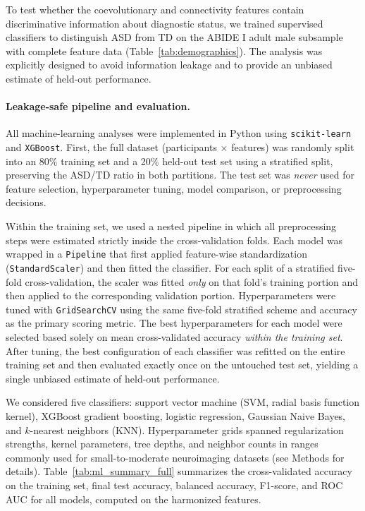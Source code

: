 \documentclass[10pt,letterpaper]{article}
\begin{document}
To test whether the coevolutionary and connectivity features contain discriminative information
about diagnostic status, we trained supervised classifiers to distinguish ASD from TD on the ABIDE I
adult male subsample with complete feature data (Table~\ref{tab:demographics}). The analysis was
explicitly designed to avoid information leakage and to provide an unbiased estimate of held-out
performance.

\paragraph*{Leakage-safe pipeline and evaluation.}
All machine-learning analyses were implemented in Python using \texttt{scikit-learn} and
\texttt{XGBoost}. First, the full dataset (participants $\times$ features) was randomly split into
an 80\% training set and a 20\% held-out test set using a stratified split, preserving the ASD/TD
ratio in both partitions. The test set was \emph{never} used for feature selection, hyperparameter
tuning, model comparison, or preprocessing decisions.

Within the training set, we used a nested pipeline in which all preprocessing steps were estimated
strictly inside the cross-validation folds. Each model was wrapped in a \texttt{Pipeline} that
first applied feature-wise standardization (\texttt{StandardScaler}) and then fitted the classifier.
For each split of a stratified five-fold cross-validation, the scaler was fitted \emph{only} on
that fold's training portion and then applied to the corresponding validation portion. Hyperparameters
were tuned with \texttt{GridSearchCV} using the same five-fold stratified scheme and accuracy as
the primary scoring metric. The best hyperparameters for each model were selected based solely on
mean cross-validated accuracy \emph{within the training set}. After tuning, the best configuration
of each classifier was refitted on the entire training set and then evaluated exactly once on the
untouched test set, yielding a single unbiased estimate of held-out performance.

We considered five classifiers: support vector machine (SVM, radial basis function kernel), XGBoost
gradient boosting, logistic regression, Gaussian Naive Bayes, and $k$-nearest neighbors (KNN).
Hyperparameter grids spanned regularization strengths, kernel parameters, tree depths, and neighbor
counts in ranges commonly used for small-to-moderate neuroimaging datasets (see Methods for details).
Table~\ref{tab:ml_summary_full} summarizes the cross-validated accuracy on the training set, final
test accuracy, balanced accuracy, F1-score, and ROC AUC for all models, computed on the harmonized
features.
\end{document}
